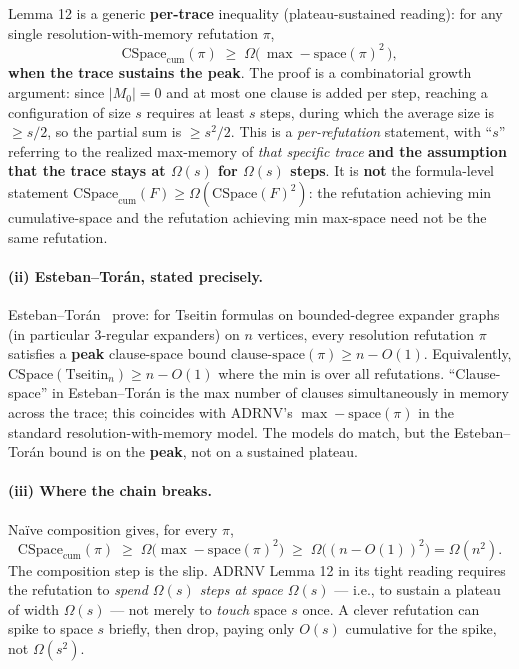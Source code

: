 \documentclass[11pt,a4paper]{article}
\theoremstyle{remark}
\begin{document}
{Lemma 12 is a generic \textbf{per-trace} inequality (plateau-sustained
reading): for any single resolution-with-memory refutation $\pi$,
\[
\mathrm{CSpace}_{\mathrm{cum}}(\pi) \;\ge\;
\Omega\!\big(\,\max\!-\!\mathrm{space}(\pi)^2\,\big),
\]
\textbf{when the trace sustains the peak}. The proof is a combinatorial
growth argument: since $|M_0|=0$ and at most one clause is added per
step, reaching a configuration of size $s$ requires at least $s$ steps,
during which the average size is $\ge s/2$, so the partial sum is $\ge
s^2/2$. This is a \emph{per-refutation} statement, with ``$s$'' referring
to the realized max-memory of \emph{that specific trace} \textbf{and the
assumption that the trace stays at $\Omega(s)$ for $\Omega(s)$ steps}.
It is \textbf{not} the formula-level statement
$\mathrm{CSpace}_{\mathrm{cum}}(F) \ge \Omega(\mathrm{CSpace}(F)^2)$: the
refutation achieving min cumulative-space and the refutation achieving
min max-space need not be the same refutation.

\paragraph{(ii) Esteban--Tor\'an, stated precisely.}
Esteban--Tor\'an~\cite{EstebanToran1999} prove: for Tseitin formulas on
bounded-degree expander graphs (in particular 3-regular expanders) on
$n$ vertices, every resolution refutation $\pi$ satisfies a \textbf{peak}
clause-space bound $\mathrm{clause\text{-}space}(\pi) \ge n - O(1)$.
Equivalently, $\mathrm{CSpace}(\mathrm{Tseitin}_n) \ge n - O(1)$ where the
min is over all refutations. ``Clause-space'' in Esteban--Tor\'an is the
max number of clauses simultaneously in memory across the trace; this
coincides with ADRNV's $\max\!-\!\mathrm{space}(\pi)$ in the standard
resolution-with-memory model. The models do match, but the
Esteban--Tor\'an bound is on the \textbf{peak}, not on a sustained
plateau.

\paragraph{(iii) Where the chain breaks.} \begingroup\sloppy Na\"ive composition gives, for
every $\pi$,
\[
\mathrm{CSpace}_{\mathrm{cum}}(\pi) \;\ge\;
\Omega\!\big(\max\!-\!\mathrm{space}(\pi)^2\big) \;\ge\;
\Omega\!\big((n - O(1))^2\big) = \Omega(n^2).
\]
The composition step is the slip. ADRNV Lemma 12 in its tight reading
requires the refutation to \emph{spend $\Omega(s)$ steps at space
$\Omega(s)$} --- i.e., to sustain a plateau of width $\Omega(s)$ --- not
merely to \emph{touch} space $s$ once. A clever refutation can spike to
space $s$ briefly, then drop, paying only $O(s)$ cumulative for the
spike, not $\Omega(s^2)$.

}
\end{document}
